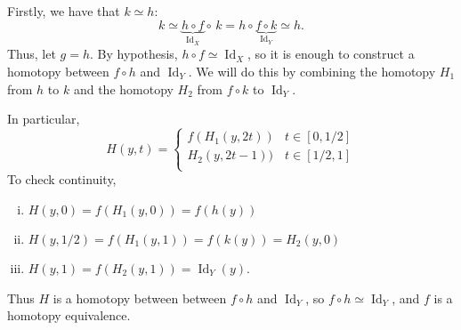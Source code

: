 \documentclass{article}
\newenvironment{solution}[1][Solution.]{\begin{trivlist}
\item[\hskip \labelsep {\bfseries #1}]}{\end{trivlist}}
\begin{document}
\begin{solution} \text{}
  Firstly, we have that $k \simeq h$: \[
    k
    \simeq \underbrace{h \circ f}_{\operatorname{Id}_X} \circ\, k
    = h \circ \underbrace{f \circ k}_{\operatorname{Id}_Y}
    \simeq h.
  \]
  Thus, let $g = h$. By hypothesis, $h \circ f \simeq \operatorname{Id}_X$, so it is
  enough to construct a homotopy between $f \circ h$ and $\operatorname{Id}_Y$.
  We will do this by combining the homotopy $H_1$ from $h$ to $k$ and the
  homotopy $H_2$ from $f \circ k$ to $\operatorname{Id}_Y$.

  In particular, \[
    H(y, t) = \begin{cases}
      f(H_1(y, 2t)) & t \in [0, 1/2] \\
      H_2(y, 2t - 1)) & t \in [1/2, 1] \\
    \end{cases}
  \]
  To check continuity, \begin{enumerate}[(i)]
    \item $H(y, 0) = f(H_1(y, 0)) = f(h(y))$
    \item $H(y, 1/2) = f(H_1(y, 1)) = f(k(y)) = H_2(y, 0)$
    \item $H(y, 1) = f(H_2(y, 1)) = \operatorname{Id}_Y(y)$.
  \end{enumerate}
  Thus $H$ is a homotopy between between $f \circ h$ and $\operatorname{Id}_Y$,
  so $f \circ h \simeq \operatorname{Id}_Y$, and $f$ is a homotopy equivalence.
\end{solution}
\end{document}
